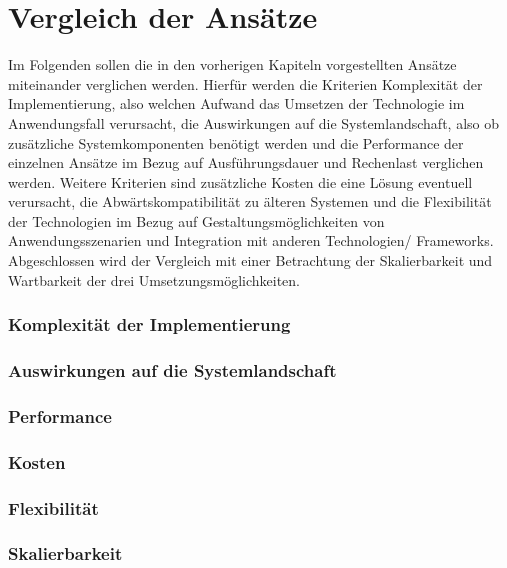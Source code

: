 \section{Vergleich der Ansätze}

Im Folgenden sollen die in den vorherigen Kapiteln vorgestellten Ansätze miteinander verglichen werden. Hierfür werden die Kriterien Komplexität der Implementierung, also welchen Aufwand das Umsetzen der Technologie im Anwendungsfall verursacht, die Auswirkungen auf die Systemlandschaft, also ob zusätzliche Systemkomponenten benötigt werden und die Performance der einzelnen Ansätze im Bezug auf Ausführungsdauer und Rechenlast verglichen werden. Weitere Kriterien sind zusätzliche Kosten die eine Lösung eventuell verursacht, die Abwärtskompatibilität zu älteren Systemen und die Flexibilität der Technologien im Bezug auf Gestaltungsmöglichkeiten von Anwendungsszenarien und Integration mit anderen Technologien/ Frameworks. Abgeschlossen wird der Vergleich mit einer Betrachtung der Skalierbarkeit und Wartbarkeit der drei Umsetzungsmöglichkeiten.

\subsubsection{Komplexität der Implementierung}



\subsubsection{Auswirkungen auf die Systemlandschaft}



\subsubsection{Performance}



\subsubsection{Kosten}



\subsubsection{Flexibilität}



\subsubsection{Skalierbarkeit}



